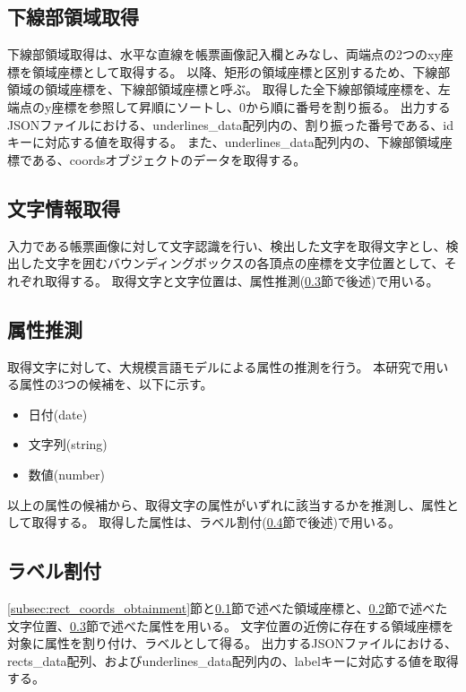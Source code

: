 \subsection{下線部領域取得}\label{subsec:underline_coords_obtainment}
下線部領域取得は、水平な直線を帳票画像記入欄とみなし、両端点の2つのxy座標を領域座標として取得する。
以降、矩形の領域座標と区別するため、下線部領域の領域座標を、下線部領域座標と呼ぶ。
取得した全下線部領域座標を、左端点のy座標を参照して昇順にソートし、0から順に番号を割り振る。
出力するJSONファイルにおける、underlines\_data配列内の、割り振った番号である、idキーに対応する値を取得する。
また、underlines\_data配列内の、下線部領域座標である、coordsオブジェクトのデータを取得する。

\subsection{文字情報取得}\label{subsec:char_information_obtainment}
入力である帳票画像に対して文字認識を行い、検出した文字を取得文字とし、検出した文字を囲むバウンディングボックスの各頂点の座標を文字位置として、それぞれ取得する。
取得文字と文字位置は、属性推測(\ref{subsec:att_prediction}節で後述)で用いる。

\subsection{属性推測}\label{subsec:att_prediction}
取得文字に対して、大規模言語モデルによる属性の推測を行う。
本研究で用いる属性の3つの候補を、以下に示す。

\begin{itemize}
    \item 日付(date)
    \item 文字列(string)
    \item 数値(number)
\end{itemize}

以上の属性の候補から、取得文字の属性がいずれに該当するかを推測し、属性として取得する。
取得した属性は、ラベル割付(\ref{subsec:label_link}節で後述)で用いる。

\subsection{ラベル割付}\label{subsec:label_link}
\ref{subsec:rect_coords_obtainment}節と\ref{subsec:underline_coords_obtainment}節で述べた領域座標と、\ref{subsec:char_information_obtainment}節で述べた文字位置、\ref{subsec:att_prediction}節で述べた属性を用いる。
文字位置の近傍に存在する領域座標を対象に属性を割り付け、ラベルとして得る。
出力するJSONファイルにおける、rects\_data配列、およびunderlines\_data配列内の、labelキーに対応する値を取得する。

